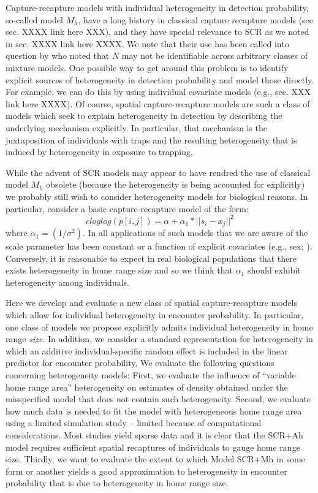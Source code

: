 Capture-recapture models with individual heterogeneity in detection
probability, so-called model $M_{h}$, have a long history in classical
capture recapture models (see sec. XXXX link here XXX), and they have
special relevance to SCR as we noted in sec. XXXX link here XXXX.  We
note that their use has been called into question by \citet{link:2003}
who noted that $N$ may not be identifiable across arbitrary classes of
mixture models.  One possible way to get around this problem is to
identify explicit sources of heterogeneity in detection probability
and model those directly. For example, we can do this by using
individual covariate models (e.g., sec. XXX link here XXXX). Of
course, spatial capture-recapture models are such a class of models
which seek to explain heterogeneity in detection by describing the
underlying mechanism explicitly. In particular, that mechanism is the
juxtaposition of individuals with traps and the resulting
heterogeneity that is induced by heterogeneity in exposure to
trapping.



While the advent of SCR models may appear to have rendred the use of
classical model $M_h$ obsolete (because the heterogeneity is being
accounted for explicitly) we probably still wish to consider
heterogeneity models for biological reasons.
In particular, consider a basic capture-recapture model of the form:
\[
 cloglog(p[i,j]) = \alpha + \alpha_1*||s_{i} - x_{j}||^2
\]
where $\alpha_{1} = (1/\sigma^{2})$.  
In all applications of such models that we are aware of the scale
parameter has been constant or a function of explicit covariates
(e.g., sex; \citet{gardner_etal:2010}). Conversely, it is reasonable
to expect in real biological populations that there exists
heterogeneity in home range size and so we think that $\alpha_{1}$
should exhibit heterogeneity among individuals. 

Here we develop and evaluate a new class of spatial capture-recapture
models which allow for individual heterogeneity in encounter
probability.  In particular, one class of models we propose explicitly
admits individual heterogeneity in home range {\it size}. In addition,
we consider a standard representation for heterogeneity in which an
additive individual-specific random effect is included in the linear
predictor for encounter probability.  We evaluate the following
questions concerning heterogeneity models: First, we evaluate the
influence of ``variable home range area'' heterogeneity on estimates
of density obtained under the misspecified model that does not contain
such heterogeneity.  Second, we evaluate how much data is needed to
fit the model with heterogeneous home range area using a limited
simulation study -- limited because of computational considerations.
Most studies yield sparse data and it is clear that the SCR+Ah model
requires sufficient spatial recaptures of individuals to gauge home
range size.  Thirdly, we want to evaluate the extent to which Model
SCR+Mh in some form or another yields a good approximation to
heterogeneity in encounter probability that is due to heterogeneity in
home range size.

